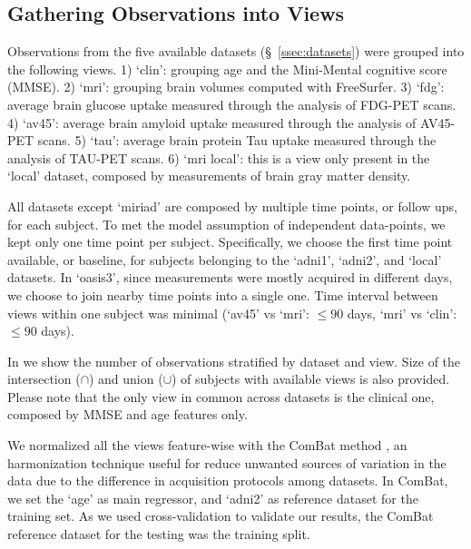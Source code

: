 \subsection{Gathering Observations into Views}
\label{ssec:views}


Observations from the five available datasets (\S~\ref{ssec:datasets}) were grouped into the following views.
1) `clin': grouping age and the Mini-Mental cognitive score (MMSE).
2) `mri': grouping brain volumes computed with FreeSurfer.
3) `fdg': average brain glucose uptake measured through the analysis of FDG-PET scans.
4) `av45': average brain amyloid uptake measured through the analysis of AV45-PET scans.
5) `tau': average brain protein Tau uptake measured through the analysis of TAU-PET scans.
6) `mri local': this is a view only present in the `local' dataset, composed by measurements of brain gray matter density.

All datasets except `miriad' are composed by multiple time points, or follow ups, for each subject.
To met the model assumption of independent data-points, we kept only one time point per subject.
Specifically, we choose the first time point available, or baseline, for subjects belonging to the `adni1', `adni2', and `local' datasets.
In `oasis3', since measurements were mostly acquired in different days, we choose to join nearby time points into a single one.
Time interval between views within one subject was minimal (`av45' vs `mri': $\leq 90$ days, `mri' vs `clin': $\leq 90$ days).

In  we show the number of observations stratified by dataset and view.
Size of the intersection ($\cap$) and union ($\cup$) of subjects with available views is also provided.
Please note that the only view in common across datasets is the clinical one, composed by MMSE and age features only.

We normalized all the views feature-wise with the ComBat method \citep{Fortin2018}, an harmonization technique useful for reduce unwanted sources of variation in the data due to the difference in acquisition protocols among datasets.
In ComBat, we set the `age' as main regressor, and `adni2' as reference dataset for the training set.
As we used cross-validation to validate our results, the ComBat reference dataset for the testing was the training split.

